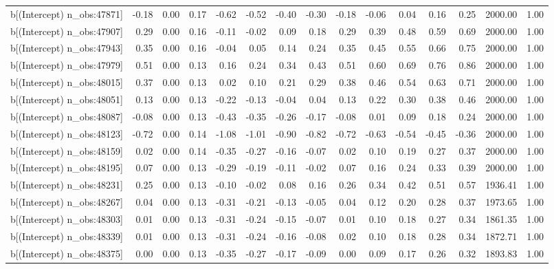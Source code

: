 \begin{table}[ht]
\begin{tabular}{rrrrrrrrrrrrrrr}
  b[(Intercept) n\_obs:47871] & -0.18 & 0.00 & 0.17 & -0.62 & -0.52 & -0.40 & -0.30 & -0.18 & -0.06 & 0.04 & 0.16 & 0.25 & 2000.00 & 1.00 \\ 
  b[(Intercept) n\_obs:47907] & 0.29 & 0.00 & 0.16 & -0.11 & -0.02 & 0.09 & 0.18 & 0.29 & 0.39 & 0.48 & 0.59 & 0.69 & 2000.00 & 1.00 \\ 
  b[(Intercept) n\_obs:47943] & 0.35 & 0.00 & 0.16 & -0.04 & 0.05 & 0.14 & 0.24 & 0.35 & 0.45 & 0.55 & 0.66 & 0.75 & 2000.00 & 1.00 \\ 
  b[(Intercept) n\_obs:47979] & 0.51 & 0.00 & 0.13 & 0.16 & 0.24 & 0.34 & 0.43 & 0.51 & 0.60 & 0.69 & 0.76 & 0.86 & 2000.00 & 1.00 \\ 
  b[(Intercept) n\_obs:48015] & 0.37 & 0.00 & 0.13 & 0.02 & 0.10 & 0.21 & 0.29 & 0.38 & 0.46 & 0.54 & 0.63 & 0.71 & 2000.00 & 1.00 \\ 
  b[(Intercept) n\_obs:48051] & 0.13 & 0.00 & 0.13 & -0.22 & -0.13 & -0.04 & 0.04 & 0.13 & 0.22 & 0.30 & 0.38 & 0.46 & 2000.00 & 1.00 \\ 
  b[(Intercept) n\_obs:48087] & -0.08 & 0.00 & 0.13 & -0.43 & -0.35 & -0.26 & -0.17 & -0.08 & 0.01 & 0.09 & 0.18 & 0.24 & 2000.00 & 1.00 \\ 
  b[(Intercept) n\_obs:48123] & -0.72 & 0.00 & 0.14 & -1.08 & -1.01 & -0.90 & -0.82 & -0.72 & -0.63 & -0.54 & -0.45 & -0.36 & 2000.00 & 1.00 \\ 
  b[(Intercept) n\_obs:48159] & 0.02 & 0.00 & 0.14 & -0.35 & -0.27 & -0.16 & -0.07 & 0.02 & 0.10 & 0.19 & 0.27 & 0.37 & 2000.00 & 1.00 \\ 
  b[(Intercept) n\_obs:48195] & 0.07 & 0.00 & 0.13 & -0.29 & -0.19 & -0.11 & -0.02 & 0.07 & 0.16 & 0.24 & 0.33 & 0.39 & 2000.00 & 1.00 \\ 
  b[(Intercept) n\_obs:48231] & 0.25 & 0.00 & 0.13 & -0.10 & -0.02 & 0.08 & 0.16 & 0.26 & 0.34 & 0.42 & 0.51 & 0.57 & 1936.41 & 1.00 \\ 
  b[(Intercept) n\_obs:48267] & 0.04 & 0.00 & 0.13 & -0.31 & -0.21 & -0.13 & -0.05 & 0.04 & 0.12 & 0.20 & 0.28 & 0.37 & 1973.65 & 1.00 \\ 
  b[(Intercept) n\_obs:48303] & 0.01 & 0.00 & 0.13 & -0.31 & -0.24 & -0.15 & -0.07 & 0.01 & 0.10 & 0.18 & 0.27 & 0.34 & 1861.35 & 1.00 \\ 
  b[(Intercept) n\_obs:48339] & 0.01 & 0.00 & 0.13 & -0.31 & -0.24 & -0.16 & -0.08 & 0.02 & 0.10 & 0.18 & 0.28 & 0.34 & 1872.71 & 1.00 \\ 
  b[(Intercept) n\_obs:48375] & 0.00 & 0.00 & 0.13 & -0.35 & -0.27 & -0.17 & -0.09 & 0.00 & 0.09 & 0.17 & 0.26 & 0.32 & 1893.83 & 1.00 \\ 

\end{tabular}
\end{table}
